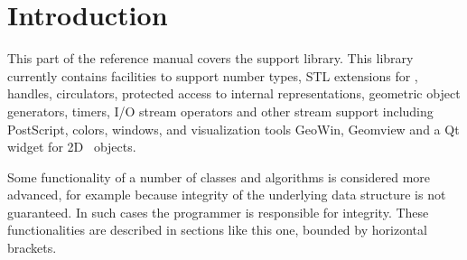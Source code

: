 \cleardoublepage

\chapter{Introduction}



This part of the reference manual covers the support library. This library
currently contains facilities to support number types, STL extensions for 
\cgal, handles, circulators, protected access to internal representations, 
geometric object generators, timers, I/O stream operators and other stream 
support including PostScript, colors, windows, and visualization tools 
GeoWin, Geomview and a Qt widget for 2D \cgal\ objects.

\begin{ccAdvanced}
Some functionality of a number of classes and algorithms is considered more
advanced, for example because integrity of the underlying data structure
is not guaranteed.
In such cases the programmer is responsible for integrity.
These functionalities are described in sections like this one, bounded by
horizontal brackets.
\end{ccAdvanced}

